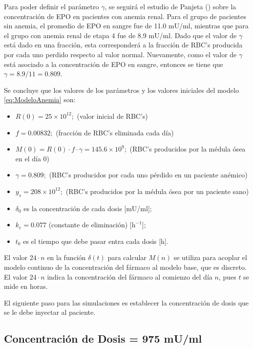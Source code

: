 Para poder definir el parámetro $\gamma$, se seguirá el estudio de Panjeta (\cite{panjeta2017interpretation}) sobre la concentración de EPO en pacientes con anemia renal. Para el grupo de pacientes sin anemia, el promedio de EPO en sangre fue de 11.0 mU/ml, mientras que para el grupo con anemia renal de etapa 4 fue de 8.9 mU/ml. Dado que el valor de $\gamma$ está dado en una fracción, esta corresponderá a la fracción de RBC's producida por cada uno perdido respecto al valor normal. Nuevamente, como el valor de $\gamma$ está asociado a la concentración de EPO en sangre, entonces se tiene que $\gamma = 8.9/11 = 0.809$.

Se concluye que los valores de los parámetros y los valores iniciales del modelo \ref{eq:ModeloAnemia} son:

\begin{itemize}
    \item $R(0) = 25\times 10^{12};$ (valor inicial de RBC's)
    \item $f=0.00832;$ (fracción de RBC's eliminada cada día)
    \item $M(0) = R(0)\cdot f \cdot \gamma = 145.6\times 10^{9};$ (RBC's producidos por la médula ósea en el día 0)
    \item $\gamma = 0.809;$ (RBC's producidos por cada uno pérdido en un paciente anémico) 
    \item $y_s = 208\times 10^{12};$ (RBC's producidos por la médula ósea por un paciente sano)
    \item $\delta_0$ es la concentración de cada dosis [mU/ml];
    \item $k_e=0.077$ (constante de eliminación) [$\textrm{h}^{-1}$];
    \item $t_0$ es el tiempo que debe pasar entra cada dosis [h].
\end{itemize}

El valor $24\cdot n$ en la función $\delta(t)$ para calcular $M(n)$ se utiliza para acoplar el modelo continuo de la concentración del fármaco al modelo base, que es discreto. El valor $24 \cdot n$ indica la concentración del fármaco al comienzo del día $n$, pues $t$ se mide en horas.


El siguiente paso para las simulaciones es establecer la concentración de dosis que se le debe inyectar al paciente.

\subsection{Concentración de Dosis  = 975 mU/ml} \label{subsec:variaciones:anemia:mal}

